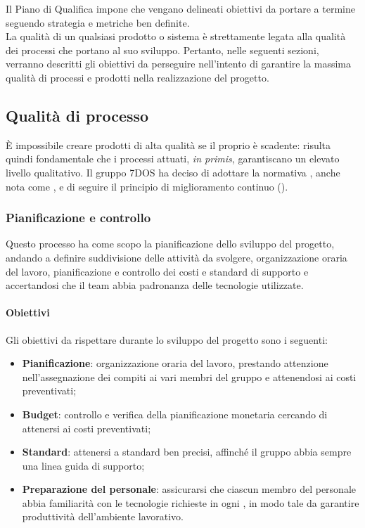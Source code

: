 Il Piano di Qualifica impone che vengano delineati obiettivi da portare a termine seguendo strategia e metriche ben definite.\\
La qualità di un qualsiasi prodotto o sistema è strettamente legata alla qualità dei processi che portano al suo sviluppo. Pertanto, nelle seguenti sezioni, verranno descritti gli obiettivi da perseguire nell'intento di garantire la massima qualità di processi e prodotti nella realizzazione del progetto.

\subsection{Qualità di processo}
	È impossibile creare prodotti di alta qualità se il proprio  è scadente: risulta quindi fondamentale che i processi attuati, \emph{in primis}, garantiscano un elevato livello qualitativo. Il gruppo 7DOS ha deciso di adottare la normativa , anche nota come , e di seguire il principio di miglioramento continuo ().


\subsubsection{Pianificazione e controllo}
Questo processo ha come scopo la pianificazione dello sviluppo del progetto, andando a definire suddivisione delle attività da svolgere, organizzazione oraria del lavoro, pianificazione e controllo dei costi e standard di supporto e accertandosi che il team abbia padronanza delle tecnologie utilizzate.
\paragraph{Obiettivi} \Spazio
Gli obiettivi da rispettare durante lo sviluppo del progetto sono i seguenti:
	\begin{itemize}
		\item{\textbf{Pianificazione}: organizzazione oraria del lavoro, prestando attenzione nell'assegnazione dei compiti ai vari membri del gruppo e attenendosi ai costi preventivati;
		}
		\item{\textbf{Budget}: controllo e verifica della pianificazione monetaria cercando di attenersi ai costi preventivati;
		}
		\item{\textbf{Standard}: attenersi a standard ben precisi, affinché il gruppo abbia sempre una linea guida di supporto;
		}
		\item{\textbf{Preparazione del personale}: assicurarsi che ciascun membro del personale abbia familiarità con le tecnologie richieste in ogni , in modo tale da garantire produttività dell'ambiente lavorativo.
		}
	\end{itemize}

